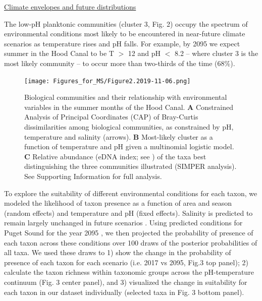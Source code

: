 \documentclass[11pt]{article}
\begin{document}
\begin{linenumbers}
\underline{Climate envelopes and future distributions}

The low-pH planktonic communities (cluster 3, Fig. 2) occupy the spectrum of environmental conditions most likely to be encountered in near-future climate scenarios as temperature rises and pH falls. For example, by 2095 we expect summer in the Hood Canal to be T $>$ 12 and pH $<$ 8.2 -- where cluster 3 is the most likely community -- to occur more than two-thirds of the time (68\%). 




\begin{figure}%
\centering
\texttt{[image: Figures\_for\_MS/Figure2.2019-11-06.png]}
\caption{\footnotesize{Biological communities and their relationship with environmental variables in the summer months of the Hood Canal. \textbf{A} Constrained Analysis of Principal Coordinates (CAP) of Bray-Curtis dissimilarities among biological communities, as constrained by pH, temperature and salinity (arrows). \textbf{B} Most-likely cluster as a function of temperature and pH given a multinomial logistic model. \textbf{C} Relative abundance (eDNA index; see \cite{kelly2019understanding}) of the taxa best distinguishing the three communities illustrated (SIMPER analysis). See Supporting Information for full analysis.}}
\label{fig:Fig2}
\end{figure}
 To explore the suitability of different environmental conditions for each taxon, we modeled the likelihood of taxon presence as a function of area and season (random effects) and temperature and pH (fixed effects).  Salinity is predicted to remain largely unchanged in future scenarios \cite{khangaonkar2019salish}. Using predicted conditions for Puget Sound for the year 2095 \cite{khangaonkar2019salish}, we then projected the probability of presence of each taxon across these conditions over 100 draws of the posterior probabilities of all taxa. We used these draws to 1) show the change in the probability of presence of each taxon for each scenario (i.e. 2017 vs 2095, Fig.3 top panel); 2) calculate the  taxon richness within taxonomic groups across the pH-temperature continuum (Fig. 3 center panel),%
  and 3) visualized the change in suitability for each taxon in our dataset individually (selected taxa in Fig. 3 bottom panel). 


\end{linenumbers}
\end{document}
